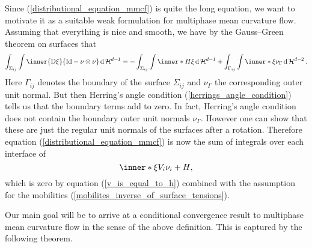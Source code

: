 Since (\ref{distributional_equation_mmcf}) is quite the long equation, we want 
to motivate it as a suitable weak formulation for multiphase mean curvature 
flow. 
Assuming that everything is nice and smooth, we have by the 
Gauss--Green theorem on surfaces 
\cite[Thm.~11.8]{maggi_sets_of_finite_perimeter} that
\begin{equation*}
	\int_{ \Sigma_{ i j } }
	\int 
	\inner{ \diff \xi }{ \mathrm{Id} - \nu \otimes \nu }
	\dd{\hm^{ d- 1 }}
	=
	-
	\int_{ \Sigma_{ i j } }
	\int
	 \inner*{ H }{ \xi }
	\dd{\hm^{ d- 1 }}
	+
	\int_{ \Gamma_{ i j } }
	\int
	\inner*{ \xi }{ \nu_{ \Gamma } }
	\dd{ \hm^{ d - 2 } }.
\end{equation*}
Here $ \Gamma_{ i j } $ denotes the boundary of the surface $ \Sigma_{ i j 
} $ and $ \nu_{ \Gamma } $ the corresponding outer unit normal. But then 
Herring's 
angle condition 
(\ref{herrings_angle_condition}) tells us that the boundary terms add to zero. 
In fact, Herring's angle condition does not contain the boundary outer unit 
normals $ \nu_{ \Gamma } $. However one can show that these are just the 
regular unit normals of the surfaces after a rotation. 
Therefore equation 
(\ref{distributional_equation_mmcf}) is now the sum of integrals over
each interface of
\begin{equation*}
	 \inner*{ \xi }{ V_{ i } \nu_{ i } + H },
\end{equation*}
which is zero by equation (\ref{v_is_equal_to_h}) combined with the 
assumption for the mobilities (\ref{mobilites_inverse_of_surface_tensions}).

Our main goal will be to arrive at a conditional convergence result 
to multiphase mean curvature flow in the sense of the above definition. 
This is captured by the following theorem.

